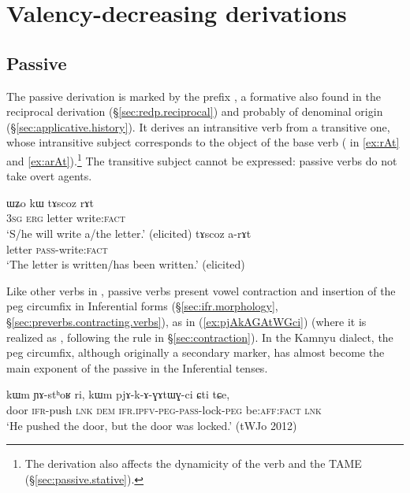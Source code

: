 \chapter{Valency-decreasing derivations}  \label{chap:valency.decreasing.derivation}

 
\section{Passive} \label{sec:passive}
The passive derivation is marked by the prefix  , a formative also found in the reciprocal derivation (§\ref{sec:redp.reciprocal}) and probably of denominal origin (§\ref{sec:applicative.history}). It derives an intransitive verb from a transitive one, whose intransitive subject corresponds to the object of the base verb ( in \ref{ex:rAt} and \ref{ex:arAt}).\footnote{The derivation also affects the dynamicity of the verb and the TAME (§\ref{sec:passive.stative}). } The transitive subject cannot be expressed: passive verbs do not take overt agents.

\begin{exe}
	\ex 
	\begin{xlist}	
		\ex \label{ex:rAt}
		\gll ɯʑo kɯ tɤscoz rɤt \\
		\textsc{3sg} \textsc{erg} letter write:\textsc{fact} \\
		\glt `S/he will write a/the letter.' (elicited)
		\ex \label{ex:arAt}
		\gll tɤscoz a-rɤt \\
		letter \textsc{pass}-write:\textsc{fact} \\
		\glt `The letter is written/has been written.' (elicited)
	\end{xlist}	
\end{exe}


Like other verbs in , passive verbs present vowel contraction and insertion of the peg circumfix  in Inferential forms (§\ref{sec:ifr.morphology}, §\ref{sec:preverbs.contracting.verbs}), as in (\ref{ex:pjAkAGAtWGci}) (where it is realized as , following the rule in §\ref{sec:contraction}). In the Kamnyu dialect, the peg circumfix, although originally a secondary marker, has almost become the main exponent of the passive in the Inferential tenses.

\begin{exe}
\ex \label{ex:pjAkAGAtWGci}
 \gll kɯm ɲɤ-stʰoʁ ri, kɯm pjɤ-k-ɤ-ɣɤtɯɣ-ci ɕti tɕe,  \\
 door \textsc{ifr}-push \textsc{lnk} \textsc{dem} \textsc{ifr}.\textsc{ipfv}-\textsc{peg}-\textsc{pass}-lock-\textsc{peg} be:\textsc{aff}:\textsc{fact} \textsc{lnk} \\
\glt  `He pushed the door, but the door was locked.' (tWJo 2012) 
\end{exe} 


